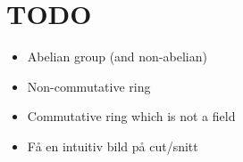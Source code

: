\section{TODO}\par
\begin{itemize}
  \item Abelian group (and non-abelian)
  \item Non-commutative ring
  \item Commutative ring which is not a field
  \item Få en intuitiv bild på cut/snitt 
\end{itemize}
